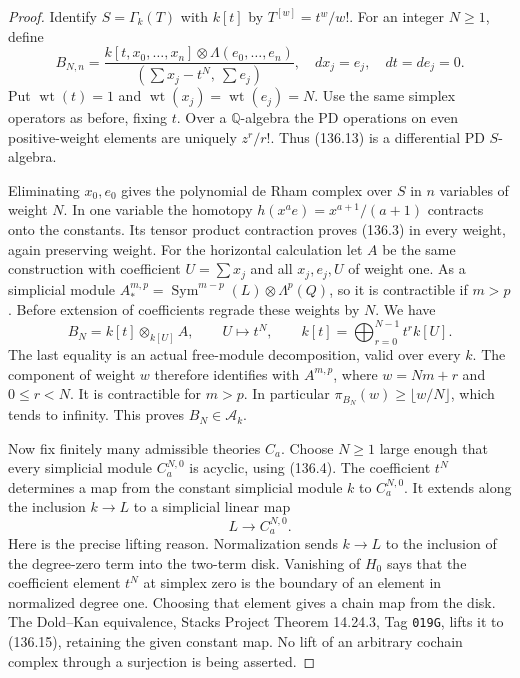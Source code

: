 \begin{proof}
Identify $S=\Gamma_k(T)$ with $k[t]$ by
$T^{[w]}=t^w/w!$.  For an integer $N\geq1$, define
\[
 B_{N,n}=
 \frac{k[t,x_0,\ldots,x_n]\otimes\Lambda(e_0,\ldots,e_n)}
      {(\sum x_j-t^N,\ \sum e_j)},
 \quad dx_j=e_j,\quad dt=de_j=0.                           \tag{136.13}
\]
Put $\operatorname{wt}(t)=1$ and
$\operatorname{wt}(x_j)=\operatorname{wt}(e_j)=N$.
Use the same simplex operators as before, fixing $t$.
Over a $\mathbb Q$-algebra the PD operations on even
positive-weight elements are uniquely $z^r/r!$.
Thus (136.13) is a differential PD $S$-algebra.

Eliminating $x_0,e_0$ gives the polynomial de Rham
complex over $S$ in $n$ variables of weight $N$.
In one variable the homotopy
$h(x^ae)=x^{a+1}/(a+1)$ contracts onto the constants.
Its tensor product contraction proves (136.3) in every
weight, again preserving weight.  For the horizontal
calculation let $A$ be the same construction with
coefficient $U=\sum x_j$ and all $x_j,e_j,U$ of weight
one.  As a simplicial module
$A_*^{m,p}=\operatorname{Sym}^{m-p}(L)\otimes\Lambda^p(Q)$,
so it is contractible if $m>p$.
Before extension of coefficients regrade these weights
by $N$.  We have
\[
 B_N=k[t]\otimes_{k[U]}A,\qquad U\longmapsto t^N,
 \qquad k[t]=\bigoplus_{r=0}^{N-1}t^r k[U].                \tag{136.14}
\]
The last equality is an actual free-module decomposition,
valid over every $k$.  The component of weight $w$
therefore identifies with $A^{m,p}$, where
$w=Nm+r$ and $0\leq r<N$.  It is contractible for
$m>p$.  In particular
$\pi_{B_N}(w)\geq\lfloor w/N\rfloor$, which tends to
infinity.  This proves $B_N\in\mathcal A_k$.

Now fix finitely many admissible theories $C_a$.
Choose $N\geq1$ large enough that every simplicial
module $C_a^{N,0}$ is acyclic, using (136.4).
The coefficient $t^N$ determines a map from the
constant simplicial module $k$ to $C_a^{N,0}$.
It extends along the inclusion $k\to L$ to a
simplicial linear map
\[
                         L\longrightarrow C_a^{N,0}.       \tag{136.15}
\]
Here is the precise lifting reason.  Normalization
sends $k\to L$ to the inclusion of the degree-zero
term into the two-term disk.  Vanishing of $H_0$
says that the coefficient element $t^N$ at simplex
zero is the boundary of an element in normalized
degree one.  Choosing that element gives a chain
map from the disk.  The Dold--Kan equivalence,
Stacks Project Theorem 14.24.3, Tag \texttt{019G},
lifts it to (136.15), retaining the given constant
map.  No lift of an arbitrary cochain complex
through a surjection is being asserted.


\end{proof}

